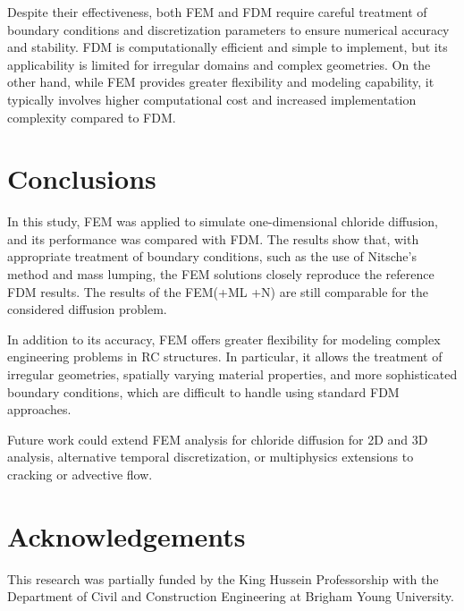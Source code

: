 \documentclass[conference]{IEEEtran}
\begin{document}
Despite their effectiveness, both FEM and FDM require careful treatment of boundary conditions and discretization parameters to ensure numerical accuracy and stability.
FDM is computationally efficient and simple to implement, but its applicability is limited for irregular domains and complex geometries.
On the other hand, while FEM provides greater flexibility and modeling capability, it typically involves higher computational cost and increased implementation complexity compared to FDM.

\section{Conclusions}

In this study, FEM was applied to simulate one-dimensional chloride diffusion, and its performance was compared with FDM.
The results show that, with appropriate treatment of boundary conditions, such as the use of Nitsche's method and mass lumping, the FEM solutions closely reproduce the reference FDM results. The results of the FEM(+ML +N) are still comparable for the considered diffusion problem. 

In addition to its accuracy, FEM offers greater flexibility for modeling complex engineering problems in RC structures.
In particular, it allows the treatment of irregular geometries, spatially varying material properties, and more sophisticated boundary conditions, which are difficult to handle using standard FDM approaches.

Future work could extend FEM analysis for chloride diffusion for 2D and 3D analysis, alternative temporal discretization, or multiphysics extensions to cracking or advective flow.

\section{Acknowledgements}
This research was partially funded by the King Hussein Professorship with the Department of Civil and Construction Engineering at Brigham Young University.

\end{document}
